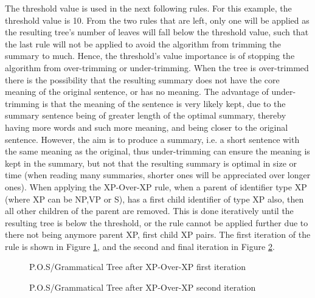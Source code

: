 \par The threshold value is used in the next following rules. For this example, the threshold value is 10. From the two rules that are left, only one will be applied as the resulting tree's number of leaves will fall below the threshold value, such that the last rule will not be applied to avoid the algorithm from trimming the summary to much. Hence, the threshold's value importance is of stopping the algorithm from over-trimming or under-trimming. When the tree is over-trimmed there is the possibility that the resulting summary does not have the core meaning of the original sentence, or has no meaning. The advantage of under-trimming is that the meaning of the sentence is very likely kept, due to the summary sentence being of greater length of the optimal summary, thereby having more words and such more meaning, and being closer to the original sentence. However, the aim is to produce a summary, i.e. a short sentence with the same meaning as the original, thus under-trimming can ensure the meaning is kept in the summary, but not that the resulting summary is optimal in size or time (when reading many summaries, shorter ones will be appreciated over longer ones). When applying the XP-Over-XP rule, when a parent of identifier type XP (where XP can be NP,VP or S), has a first child identifier of type XP also, then all other children of the parent are removed. This is done iteratively until the resulting tree is below the threshold, or the rule cannot be applied further due to there not being anymore parent XP, first child XP pairs. The first iteration of the rule is shown in Figure \ref{tree:xpOverXpFirst}, and the second and final iteration in Figure \ref{tree:xpOverXpSecond}.
\begin{figure}[h]
\caption{P.O.S/Grammatical Tree after XP-Over-XP first iteration}
\label{tree:xpOverXpFirst}
\end{figure}
\begin{figure}[h]
\caption{P.O.S/Grammatical Tree after XP-Over-XP second iteration}
\label{tree:xpOverXpSecond}
\end{figure}
